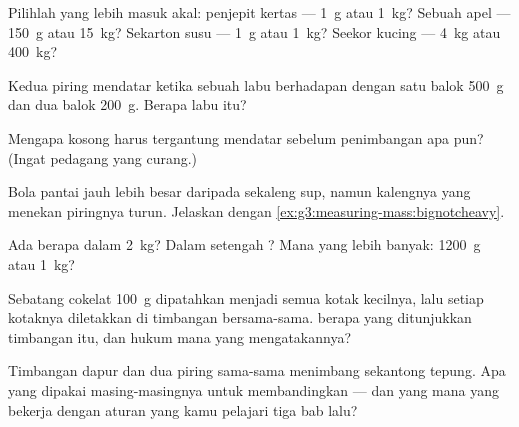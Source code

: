 \begin{exercise}[$\star$]\label{exo:g3:measuring-mass:2}
Pilihlah  yang lebih masuk akal: penjepit kertas --- \qty{1}{g}
atau \qty{1}{kg}? Sebuah apel --- \qty{150}{g} atau \qty{15}{kg}?
Sekarton susu --- \qty{1}{g} atau \qty{1}{kg}? Seekor kucing ---
\qty{4}{kg} atau \qty{400}{kg}?
\end{exercise}

\begin{exercise}[$\star$]\label{exo:g3:measuring-mass:3}
Kedua piring mendatar ketika sebuah labu berhadapan dengan satu balok
\qty{500}{g} dan dua balok \qty{200}{g}. Berapa  labu itu?
\end{exercise}

\begin{exercise}[$\star$]\label{exo:g3:measuring-mass:4}
Mengapa  kosong harus tergantung mendatar sebelum penimbangan
apa pun? (Ingat pedagang yang curang.)
\end{exercise}

\begin{exercise}[$\star$]\label{exo:g3:measuring-mass:5}
Bola pantai jauh lebih besar daripada sekaleng sup, namun kalengnya
yang menekan piringnya turun. Jelaskan dengan
\cref{ex:g3:measuring-mass:bignotcheavy}.
\end{exercise}

\begin{exercise}[$\star$]\label{exo:g3:measuring-mass:6}
Ada berapa  dalam \qty{2}{kg}? Dalam setengah ? Mana yang
lebih banyak: \qty{1200}{g} atau \qty{1}{kg}?
\end{exercise}

\begin{exercise}[$\star$]\label{exo:g3:measuring-mass:7}
Sebatang cokelat \qty{100}{g} dipatahkan menjadi semua kotak kecilnya,
lalu setiap kotaknya diletakkan di timbangan bersama-sama. 
berapa yang ditunjukkan timbangan itu, dan hukum mana yang
mengatakannya?
\end{exercise}

\begin{exercise}[$\star$]\label{exo:g3:measuring-mass:8}
Timbangan dapur dan  dua piring sama-sama menimbang sekantong
tepung. Apa yang dipakai masing-masingnya untuk membandingkan --- dan
yang mana yang bekerja dengan aturan yang kamu pelajari tiga bab lalu?
\end{exercise}

